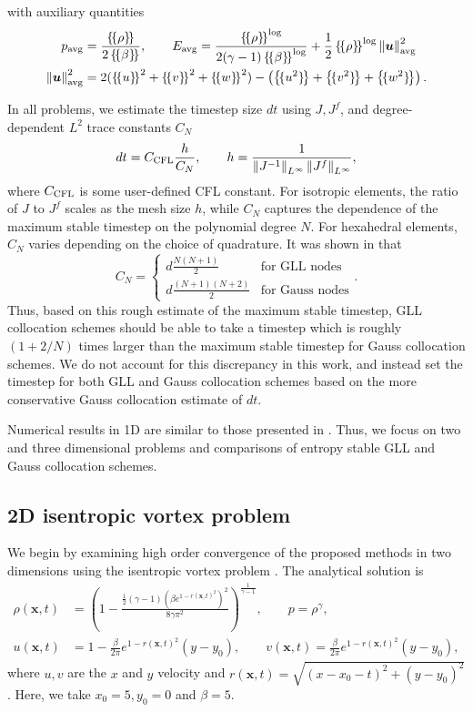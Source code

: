\documentclass[review,onefignum,onetabnum,final]{siamart171218}
\newcommand{\nor}[1]{\left\| #1 \right\|}
\newcommand{\LRp}[1]{\left( #1 \right)}
\newcommand{\LRc}[1]{\left\{ #1 \right\}}
\newcommand{\avg}[1] {\ensuremath{\LRc{\!\{#1\}\!}}}
\begin{document}
with auxiliary quantities 
\begin{align*}
p_{\rm avg} &= \frac{\avg{\rho}}{2\avg{\beta}}, \qquad E_{\rm avg} = \frac{\avg{\rho}^{\log}}{2(\gamma-1)\avg{\beta}^{\log}} + \frac{1}{2}\avg{\rho}^{\log}\nor{\bm{u}}^2_{\rm avg}\\
\nor{\bm{u}}^2_{\rm avg} &= 2(\avg{u}^2 + \avg{v}^2 + \avg{w}^2) - \LRp{\avg{u^2} +\avg{v^2} + \avg{w^2}}.\nonumber
\end{align*}

In all problems, we estimate the timestep size $dt$ using $J, J^f$, and degree-dependent $L^2$ trace constants $C_N$ 
\[
dt = C_{\rm CFL}\frac{ h}{C_N}, \qquad h = \frac{1}{{\nor{J^{-1}}_{L^{\infty}}}\nor{J^f}_{L^{\infty}}},
\]
where $C_{\rm CFL}$ is some user-defined CFL constant.  For isotropic elements, the ratio of $J$ to $J^f$ scales as the mesh size $h$, while $C_N$ captures the dependence of the maximum stable timestep on the polynomial degree $N$.  For hexahedral elements, $C_N$ varies depending on the choice of quadrature.  It was shown in \cite{chan2015gpu} that 
\[
C_N =\begin{cases}
 d\frac{N(N+1)}{2} & \text{for GLL nodes}\\
d\frac{(N+1)(N+2)}{2} & \text{for Gauss nodes}
\end{cases}.
\]
Thus, based on this rough estimate of the maximum stable timestep, GLL collocation schemes should be able to take a timestep which is roughly $(1 + 2/N)$ times larger than the maximum stable timestep for Gauss collocation schemes.  We do not account for this discrepancy in this work, and instead set the timestep for both GLL and Gauss collocation schemes based on the more conservative Gauss collocation estimate of $dt$.  %

Numerical results in 1D are similar to those presented in \cite{chan2017discretely}.  Thus, we focus on two and three dimensional problems and comparisons of entropy stable GLL and Gauss collocation schemes.  

\subsection{2D isentropic vortex problem}

We begin by examining high order convergence of the proposed methods in two dimensions using the isentropic vortex problem \cite{shu1998essentially, crean2017high}.  The analytical solution is 
\begin{align}
\rho(\bm{x},t) &= \LRp{1 - \frac{\frac{1}{2}(\gamma-1)(\beta e^{1-r(\bm{x},t)^2})^2}{8\gamma \pi^2}}^{\frac{1}{\gamma-1}}, \qquad p = \rho^{\gamma},\\
u(\bm{x},t) &= 1 - \frac{\beta}{2\pi} e^{1-r(\bm{x},t)^2}(y-y_0), \qquad v(\bm{x},t) = \frac{\beta}{2\pi} e^{1-r(\bm{x},t)^2}(y-y_0),\nonumber
\end{align}
where $u, v$ are the $x$ and $y$ velocity and $r(\bm{x},t) = \sqrt{(x-x_0-t)^2 + (y-y_0)^2}$.  Here, we take $x_0 = 5, y_0 = 0$ and $\beta = 5$.  
\end{document}
